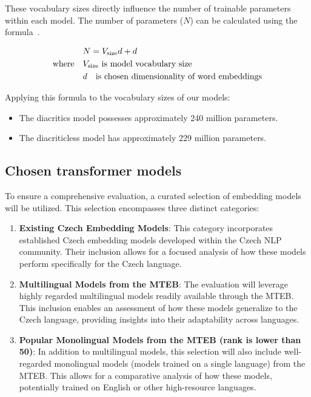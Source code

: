 These vocabulary sizes directly influence the number of trainable parameters within each model.
The number of parameters ($N$) can be calculated using the formula~.

\begin{align} \label{eq:cbow_parameters}
  & N = V_{\text{size}}d + d \\
  \text{where} \quad & V_{\text{size}} \text{ is model vocabulary size}  \notag \\
                      & d \quad \text{is chosen dimensionality of word embeddings} \notag
\end{align}
  
Applying this formula to the vocabulary sizes of our models:
\begin{itemize}
  \item The diacritics model possesses approximately 240 million parameters.
  \item The diacriticless model has approximately 229 million parameters.
\end{itemize}

\subsection{Chosen transformer models}
To ensure a comprehensive evaluation, a curated selection of embedding models will be utilized.
This selection encompasses three distinct categories:

\begin{enumerate}
  \item \textbf{Existing Czech Embedding Models}:
    This category incorporates established Czech embedding models developed within the Czech \ac{NLP} community.
    Their inclusion allows for a focused analysis of how these models perform specifically for the Czech language.
  \item \textbf{Multilingual Models from the \ac{MTEB}}:
    The evaluation will leverage highly regarded multilingual models readily available through the \ac{MTEB}.
    This inclusion enables an assessment of how these models generalize to the Czech language, providing insights into their adaptability across languages.
  \item \textbf{Popular Monolingual Models from the \ac{MTEB} (rank is lower than 50)}:
    In addition to multilingual models, this selection will also include well-regarded monolingual models (models trained on a single language) from the \ac{MTEB}.
    This allows for a comparative analysis of how these models, potentially trained on English or other high-resource languages.
\end{enumerate}

